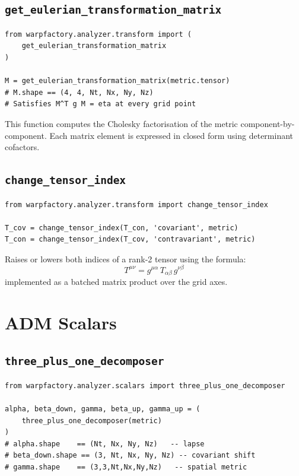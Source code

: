 \documentclass[11pt, a4paper, twoside]{report}
\begin{document}
\subsection{\texttt{get\_eulerian\_transformation\_matrix}}

\begin{lstlisting}
from warpfactory.analyzer.transform import (
    get_eulerian_transformation_matrix
)

M = get_eulerian_transformation_matrix(metric.tensor)
# M.shape == (4, 4, Nt, Nx, Ny, Nz)
# Satisfies M^T g M = eta at every grid point
\end{lstlisting}

This function computes the Cholesky factorisation of the metric
component-by-component.  Each matrix element is expressed in closed
form using determinant cofactors.

\subsection{\texttt{change\_tensor\_index}}

\begin{lstlisting}
from warpfactory.analyzer.transform import change_tensor_index

T_cov = change_tensor_index(T_con, 'covariant', metric)
T_con = change_tensor_index(T_cov, 'contravariant', metric)
\end{lstlisting}

Raises or lowers both indices of a rank-2 tensor using the formula:
\begin{equation}
  T^{\mu\nu} = g^{\mu\alpha}\,T_{\alpha\beta}\,g^{\nu\beta}
\end{equation}
implemented as a batched matrix product over the grid axes.

\section{ADM Scalars}
\label{sec:scalars}

\subsection{\texttt{three\_plus\_one\_decomposer}}

\begin{lstlisting}
from warpfactory.analyzer.scalars import three_plus_one_decomposer

alpha, beta_down, gamma, beta_up, gamma_up = (
    three_plus_one_decomposer(metric)
)
# alpha.shape    == (Nt, Nx, Ny, Nz)   -- lapse
# beta_down.shape == (3, Nt, Nx, Ny, Nz) -- covariant shift
# gamma.shape    == (3,3,Nt,Nx,Ny,Nz)   -- spatial metric
\end{lstlisting}
\end{document}
